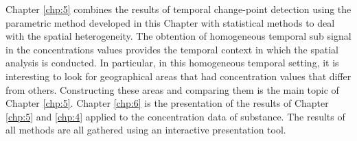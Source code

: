 Chapter \ref{chp:5} combines the results of temporal change-point detection using the parametric method developed in this Chapter with statistical methods to deal with the spatial heterogeneity. The obtention of homogeneous temporal sub signal in the concentrations values provides the temporal context in which the spatial analysis is conducted. In particular, in this homogeneous temporal setting, it is interesting to look for geographical areas that had concentration values that differ from others. Constructing these areas and comparing them is the main topic of Chapter \ref{chp:5}. Chapter \ref{chp:6} is the presentation of the results of Chapter \ref{chp:5} and \ref{chp:4} applied to the concentration data of substance. The results of all methods are all gathered using an interactive presentation tool.     

       

 